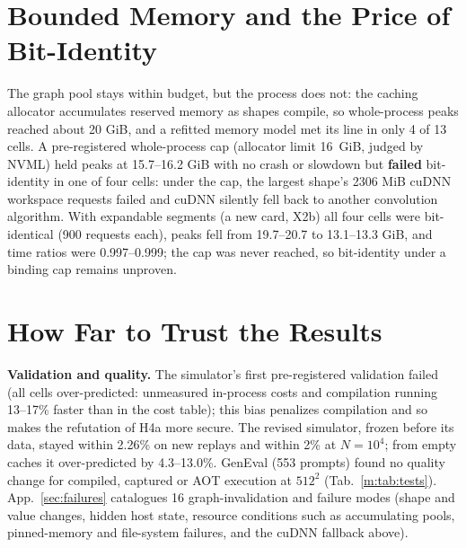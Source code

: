 \documentclass[conference]{IEEEtran}
\newcommand{\tn}[1]{#1}%
\begin{document}
\section{Bounded Memory and the Price of Bit-Identity}\label{m:mem}
The graph pool stays within budget, but the process does not: the caching allocator accumulates reserved memory as shapes compile, so whole-process peaks reached about \tn{20 GiB}, and a refitted memory model met its line in only \tn{4} of 13 cells. A pre-registered whole-process cap (allocator limit 16~GiB, judged by NVML) held peaks at \tn{15.7--16.2 GiB} with no crash or slowdown but \textbf{failed} bit-identity in one of four cells: under the cap, the largest shape's \tn{2306 MiB} cuDNN workspace requests failed and cuDNN silently fell back to another convolution algorithm. With expandable segments (a new card, X2b) all four cells were bit-identical (\tn{900} requests each), peaks fell from \tn{19.7--20.7} to \tn{13.1--13.3 GiB}, and time ratios were \tn{0.997--0.999}; the cap was never reached, so bit-identity under a binding cap remains unproven.

\section{How Far to Trust the Results}\label{m:trust}


\textbf{Validation and quality.} The simulator's first pre-registered validation failed (all cells over-predicted: unmeasured in-process costs and compilation running \tn{13--17\%} faster than in the cost table); this bias penalizes compilation and so makes the refutation of H4a more secure. The revised simulator, frozen before its data, stayed within \tn{2.26\%} on new replays and within \tn{2\%} at $N{=}10^4$; from empty caches it over-predicted by \tn{4.3--13.0\%}. GenEval (553 prompts) found no quality change for compiled, captured or AOT execution at $512^2$ (Tab.~\ref{m:tab:tests}). App.~\ref{sec:failures} catalogues 16 graph-invalidation and failure modes (shape and value changes, hidden host state, resource conditions such as accumulating pools, pinned-memory and file-system failures, and the cuDNN fallback above).
\end{document}
